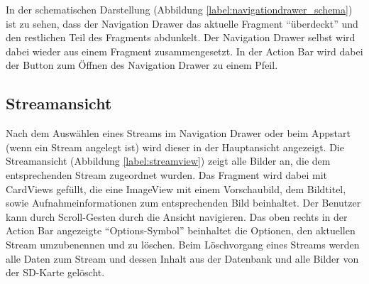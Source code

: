 In der schematischen Darstellung (Abbildung \ref{label:navigationdrawer_schema}) ist zu sehen, dass der Navigation Drawer das aktuelle Fragment \enquote{überdeckt} und den restlichen Teil des Fragments abdunkelt. Der Navigation Drawer selbst wird dabei wieder aus einem Fragment zusammengesetzt. In der Action Bar wird dabei der Button zum Öffnen des Navigation Drawer zu einem Pfeil.

\subsection{Streamansicht}
Nach dem Auswählen eines Streams im Navigation Drawer oder beim Appstart (wenn ein Stream angelegt ist) wird dieser in der Hauptansicht angezeigt. Die Streamansicht (Abbildung  \ref{label:streamview}) zeigt alle Bilder an, die dem entsprechenden Stream zugeordnet wurden. Das Fragment wird dabei mit CardViews gefüllt, die eine ImageView mit einem Vorschaubild, dem Bildtitel, sowie Aufnahmeinformationen zum entsprechenden Bild beinhaltet. Der Benutzer kann durch Scroll-Gesten durch die Ansicht navigieren. Das oben rechts in der Action Bar angezeigte \enquote{Options-Symbol} beinhaltet die Optionen, den aktuellen Stream umzubenennen und zu löschen. Beim Löschvorgang eines Streams werden alle Daten zum Stream und dessen Inhalt aus der Datenbank und alle Bilder von der SD-Karte gelöscht.

